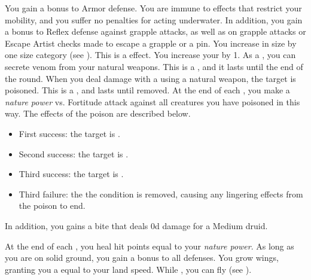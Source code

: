          You gain a  bonus to Armor defense.
         You are immune to effects that restrict your mobility, and you suffer no penalties for acting underwater.
        In addition, you gain a  bonus to Reflex defense against grapple attacks, as well as on grapple attacks or Escape Artist checks made to escape a grapple or a pin.
        You increase in size by one size category (see ).
        This is a  effect.
        You increase your  by 1.
        As a , you can secrete venom from your natural weapons.
        This is a , and it lasts until the end of the round.
        When you deal damage with a  using a natural weapon, the target is poisoned.
        This is a , and lasts until removed.
        At the end of each , you make a \textit{nature power} vs. Fortitude attack against all creatures you have poisoned in this way.
        The effects of the poison are described below.
        \begin{itemize}
            \item First success: the target is \sickened.
            \item Second success: the target is \nauseated.
            \item Third success: the target is \paralyzed.
            \item Third failure: the the condition is removed, causing any lingering effects from the poison to end.
        \end{itemize}
        \par In addition, you gains a bite  that deals \plus0d damage for a Medium druid.

        At the end of each , you heal hit points equal to your \textit{nature power}.
         As long as you are on solid ground, you gain a  bonus to all defenses.
        You grow wings, granting you a  equal to your land speed.
        While , you can fly (see ).

